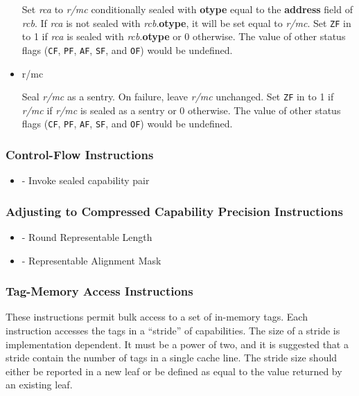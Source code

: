\begin{itemize}
    Set \emph{rca} to \emph{r/mc} conditionally sealed with
    \textbf{otype} equal to the \textbf{address} field of \emph{rcb}.
    If \emph{rca} is not sealed with \emph{rcb}.\textbf{otype}, it
    will be set equal to \emph{r/mc}.  Set \texttt{ZF} in \RFLAGS{} to
    1 if \emph{rca} is sealed with \emph{rcb}.\textbf{otype} or 0
    otherwise.  The value of other status flags (\texttt{CF},
    \texttt{PF}, \texttt{AF}, \texttt{SF}, and \texttt{OF}) would be
    undefined.

  \item {} r/mc

    Seal \emph{r/mc} as a sentry.  On failure, leave \emph{r/mc}
    unchanged.  Set \texttt{ZF} in \RFLAGS{} to 1 if \emph{r/mc} if
    \emph{r/mc} is sealed as a sentry or 0 otherwise.  The value of
    other status flags (\texttt{CF}, \texttt{PF}, \texttt{AF},
    \texttt{SF}, and \texttt{OF}) would be undefined.
\end{itemize}

\subsubsection{Control-Flow Instructions}

\begin{itemize}
  \item {} - Invoke sealed capability pair
\end{itemize}

\subsubsection{Adjusting to Compressed Capability Precision
  Instructions}

\begin{itemize}
  \item {} - Round Representable Length
  \item {} - Representable Alignment Mask
\end{itemize}

\subsubsection{Tag-Memory Access Instructions}

These instructions permit bulk access to a set of in-memory tags.
Each instruction accesses the tags in a ``stride'' of capabilities.
The size of a stride is implementation dependent.  It must be a power
of two, and it is suggested that a stride contain the number of tags
in a single cache line.  The stride size should either be reported in
a new  leaf or be defined as equal to the value
returned by an existing  leaf.

